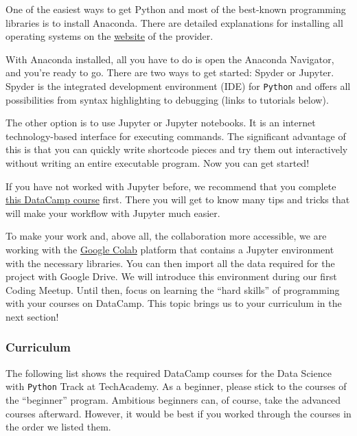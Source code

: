 \documentclass[
  11pt,
]{article}
\begin{document}
One of the easiest ways to get Python and most of the best-known programming libraries is to install Anaconda.
There are detailed explanations for installing all operating systems on the \href{https://docs.anaconda.com/anaconda/install/}{website} of the provider.

With Anaconda installed, all you have to do is open the Anaconda Navigator, and you're ready to go.
There are two ways to get started: Spyder or Jupyter.
Spyder is the integrated development environment (IDE) for \texttt{Python} and offers all possibilities from syntax highlighting to debugging (links to tutorials below).

The other option is to use Jupyter or Jupyter notebooks.
It is an internet technology-based interface for executing commands.
The significant advantage of this is that you can quickly write shortcode pieces and try them out interactively without writing an entire executable program.
Now you can get started!

If you have not worked with Jupyter before, we recommend that you complete \href{https://app.datacamp.com/learn/projects/introduction-to-projects/guided/Python}{this DataCamp course} first.
There you will get to know many tips and tricks that will make your workflow with Jupyter much easier.

To make your work and, above all, the collaboration more accessible, we are working with the \href{https://colab.research.google.com/notebooks/basic_features_overview.ipynb}{Google Colab} platform that contains a Jupyter environment with the necessary libraries.
You can then import all the data required for the project with Google Drive.
We will introduce this environment during our first Coding Meetup.
Until then, focus on learning the ``hard skills'' of programming with your courses on DataCamp.
This topic brings us to your curriculum in the next section!

\hypertarget{curriculum-1}{%
\subsubsection{Curriculum}\label{curriculum-1}}

The following list shows the required DataCamp courses for the Data Science with \texttt{Python} Track at TechAcademy.
As a beginner, please stick to the courses of the ``beginner'' program.
Ambitious beginners can, of course, take the advanced courses afterward.
However, it would be best if you worked through the courses in the order we listed them.
\end{document}
